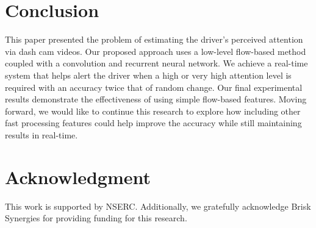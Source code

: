 \documentclass[10pt, conference, compsocconf]{IEEEtran}
\begin{document}
\section{Conclusion}
This paper presented the problem of estimating the driver's perceived attention via dash cam videos. Our proposed approach uses a low-level flow-based method coupled with a convolution and recurrent neural network. We achieve a real-time system that helps alert the driver when a high or very high attention level is required with an accuracy twice that of random change. Our final experimental results demonstrate the effectiveness of using simple flow-based features.
Moving forward, we would like to continue this research to explore how including other fast processing features could help improve the accuracy while still maintaining results in real-time.

\section*{Acknowledgment}
This work is supported by NSERC. Additionally, we gratefully acknowledge Brisk Synergies for providing funding for this research.



\end{document}

